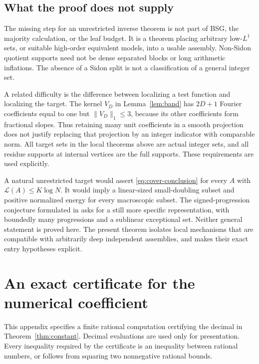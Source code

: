 \documentclass[11pt,reqno]{amsart}
\numberwithin{equation}{section}
\theoremstyle{definition}
\theoremstyle{remark}
\newcommand{\La}{\mathcal L}
\newcommand{\norm}[1]{\lVert#1\rVert}
\begin{document}
\subsection{What the proof does not supply}

The missing step for an unrestricted inverse theorem is not part of
BSG, the majority calculation, or the leaf budget. It is a theorem
placing arbitrary low-$L^1$ sets, or suitable high-order equivalent
models, into a usable assembly. Non-Sidon quotient supports need not
be dense separated blocks or long arithmetic inflations. The absence
of a Sidon split is not a classification of a general integer set.

A related difficulty is the difference between localizing a test
function and localizing the target. The kernel $V_D$ in
Lemma~\ref{lem:band} has $2D+1$ Fourier coefficients equal to one but
$\norm{V_D}_1\le3$, because its other coefficients form fractional
slopes. Thus retaining many unit coefficients in a smooth projection
does not justify replacing that projection by an integer indicator
with comparable norm. All target sets in the local theorems above
are actual integer sets, and all residue supports at internal vertices
are the full supports. These requirements are used explicitly.

A natural unrestricted target would assert
\eqref{eq:cover-conclusion} for every $A$ with
$\La(A)\le K\log N$. It would imply a linear-sized small-doubling
subset and positive normalized energy for every macroscopic subset.
The signed-progression conjecture formulated in \cite[Section 6]{BG}
asks for a still more specific representation, with boundedly many
progressions and a sublinear exceptional set. Neither general statement
is proved here. The present theorem isolates local mechanisms that
are compatible with arbitrarily deep independent assemblies, and
makes their exact entry hypotheses explicit.

\clearpage
\appendix

\section{An exact certificate for the numerical coefficient}
\label{app:certificate}

This appendix specifies a finite rational computation certifying the
decimal in Theorem~\ref{thm:constant}. Decimal evaluations are used only
for presentation. Every inequality required by the certificate is an
inequality between rational numbers, or follows from squaring two
nonnegative rational bounds.
\end{document}
